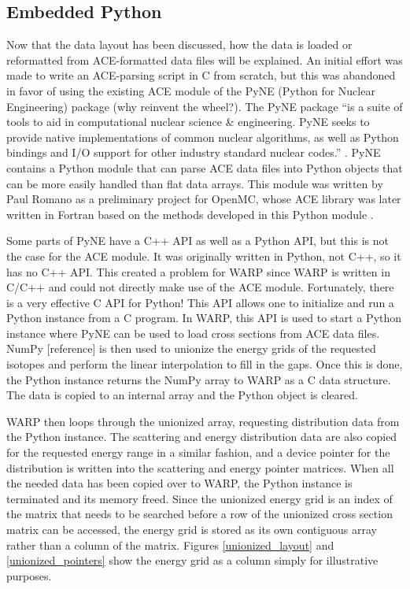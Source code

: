 \subsection{Embedded Python}

Now that the data layout has been discussed, how the data is loaded or reformatted from ACE-formatted data files will be explained.  An initial effort was made to write an ACE-parsing script in C from scratch, but this was abandoned in favor of using the existing ACE module of the PyNE (Python for Nuclear Engineering) package \cite{pyne} (why reinvent the wheel?).  The PyNE package ``is a suite of tools to aid in computational nuclear science \& engineering. PyNE seeks to provide native implementations of common nuclear algorithms, as well as Python bindings and I/O support for other industry standard nuclear codes.'' \cite{pyne}.  PyNE contains a Python module that can parse ACE data files into Python objects that can be more easily handled than flat data arrays.  This module was written by Paul Romano as a preliminary project for OpenMC, whose ACE library was later written in Fortran based on the methods developed in this Python module \cite{pyne,openmc}.  

Some parts of PyNE have a C++ API as well as a Python API, but this is not the case for the ACE module.  It was originally written in Python, not C++, so it has no C++ API.  This created a problem for WARP since WARP is written in C/C++ and could not directly make use of the ACE module.  Fortunately, there is a very effective C API for Python!  This API allows one to initialize and run a Python instance from a C program.  In WARP, this API is used to start a Python instance where PyNE can be used to load cross sections from ACE data files.  NumPy [reference] is then used to unionize the energy grids of the requested isotopes and perform the linear interpolation to fill in the gaps.  Once this is done, the Python instance returns the NumPy array to WARP as a C data structure.  The data is copied to an internal array and the Python object is cleared.  

WARP then loops through the unionized array, requesting distribution data from the Python instance.  The scattering and energy distribution data are also copied for the requested energy range in a similar fashion, and a device pointer for the distribution is written into the scattering and energy pointer matrices.  When all the needed data has been copied over to WARP, the Python instance is terminated and its memory freed.  Since the unionized energy grid is an index of the matrix that needs to be searched before a row of the unionized cross section matrix can be accessed, the energy grid is stored as its own contiguous array rather than a column of the matrix.  Figures \ref{unionized_layout} and \ref{unionized_pointers} show the energy grid as a column simply for illustrative purposes.

